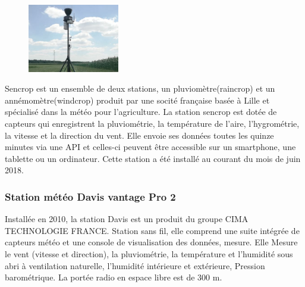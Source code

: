 \begin{figure}
\includegraphics[width=4cm]{images/imageRang3.jpg}
\end{figure}
Sencrop est un ensemble de deux stations, un pluviomètre(raincrop) et un annémomètre(windcrop) produit par une socité française basée à Lille et spécialisé dans la météo pour l’agriculture. La station sencrop est dotée de capteurs qui enregistrent la pluviométrie, la température de l’aire, l’hygrométrie, la vitesse et la direction du vent. Elle envoie ses données toutes les quinze minutes via une API et celles-ci peuvent être accessible sur un smartphone, une tablette ou un ordinateur. Cette station a été installé au courant du mois de juin 2018. 

\subsubsection{Station météo Davis vantage Pro 2}

Installée en 2010, la station Davis est un produit du groupe CIMA TECHNOLOGIE FRANCE. Station sans fil, elle comprend une suite intégrée de capteurs météo et une console de visualisation des données, mesure. Elle Mesure le vent (vitesse et direction), la pluviométrie, la température et l'humidité sous abri à ventilation naturelle, l'humidité intérieure et extérieure, Pression barométrique. La portée radio en espace libre est de 300 m.


